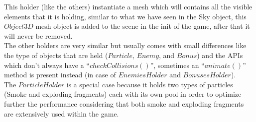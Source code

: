 \documentclass[a4paper,11pt]{article}
\begin{document}
This holder (like the others) instantiate a mesh which will contains all the visible elements that it is holding, similar to what we have seen in the Sky object, this $Object3D$ mesh object is added to the scene in the init of the game, after that it will never be removed.\\
The other holders are very similar but usually comes with small differences like the type of objects that are held ($Particle$, $Enemy$, and $Bonus$) and the APIs which don't always have a ``$checkCollisions()$'', sometimes an ``$animate()$'' method is present instead (in case of $EnemiesHolder$ and $BonusesHolder$).\\
The $ParticleHolder$ is a special case because it holds two types of particles (Smoke and exploding fragments) each with its own pool in order to optimize further the performance considering that both smoke and exploding fragments are extensively used within the game.
\end{document}
